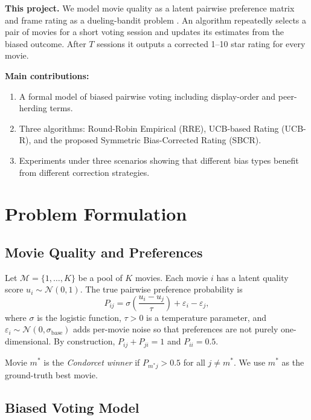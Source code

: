\documentclass[12pt,a4paper]{article}
\begin{document}
\textbf{This project.}  We model movie quality as a latent pairwise preference
matrix and frame rating as a dueling-bandit problem \cite{yue2012k}.  An algorithm
repeatedly selects a pair of movies for a short voting session and updates its
estimates from the biased outcome.  After $T$ sessions it outputs a corrected
1--10 star rating for every movie.

\textbf{Main contributions:}
\begin{enumerate}
  \item A formal model of biased pairwise voting including display-order and
    peer-herding terms.
  \item Three algorithms: Round-Robin Empirical (RRE), UCB-based Rating (UCB-R),
    and the proposed Symmetric Bias-Corrected Rating (SBCR).
  \item Experiments under three scenarios showing that different bias types benefit
    from different correction strategies.
\end{enumerate}

\section{Problem Formulation}\label{sec:formulation}

\subsection{Movie Quality and Preferences}

Let $\mathcal{M} = \{1, \dots, K\}$ be a pool of $K$ movies.  Each movie $i$ has
a latent quality score $u_i \sim \mathcal{N}(0,1)$.  The true pairwise preference
probability is
\begin{equation}\label{eq:pref}
  P_{ij} = \sigma\!\left(\frac{u_i - u_j}{\tau}\right) + \varepsilon_i - \varepsilon_j,
\end{equation}
where $\sigma$ is the logistic function, $\tau > 0$ is a temperature parameter,
and $\varepsilon_i \sim \mathcal{N}(0, \sigma_{\text{base}})$ adds per-movie noise
so that preferences are not purely one-dimensional.  By construction,
$P_{ij} + P_{ji} = 1$ and $P_{ii} = 0.5$.

Movie $m^*$ is the \emph{Condorcet winner} if $P_{m^* j} > 0.5$ for all
$j \neq m^*$.  We use $m^*$ as the ground-truth best movie.

\subsection{Biased Voting Model}
\end{document}
